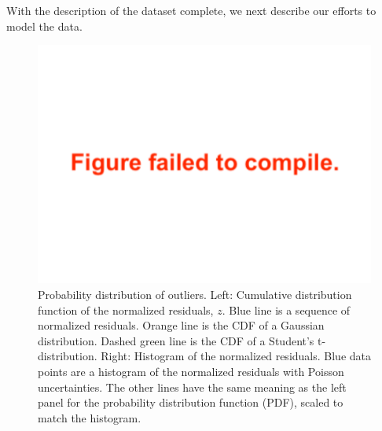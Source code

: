 \documentclass[twocolumn]{aastex63}
\begin{document}
With the description of the dataset complete, we next describe our efforts to model the data.





\begin{figure}
    \centering
    \includegraphics[width=\hsize]{figures/Students_t_optimized.pdf}
    {Probability distribution of outliers.  Left:  Cumulative distribution
        function of the normalized residuals, $z$.  Blue line is a sequence of normalized residuals.
        Orange line is the CDF of a Gaussian distribution. %
        Dashed green line is the CDF of a Student's t-
        distribution.  Right: Histogram of the normalized residuals.  Blue data points
        are a histogram of the normalized residuals with Poisson uncertainties.  The other lines
        have the same meaning as the left panel for the probability distribution function
        (PDF),  scaled to match the histogram.}
    \label{fig:timing_residuals}
\end{figure}
\end{document}
